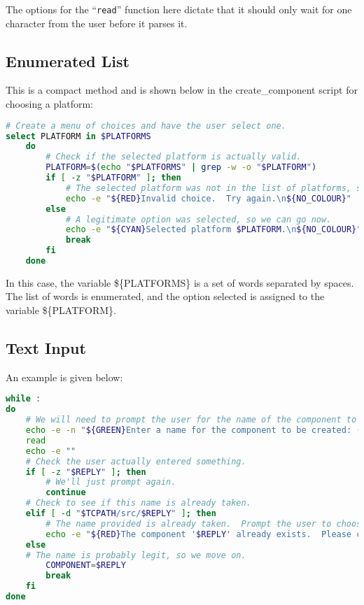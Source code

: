 \documentclass[a4paper, oneside, 11pt, titlepage, onecolumn, openright]{report}
\begin{document}
				The options for the ``\texttt{read}'' function here dictate that it should only wait for one character from the user before it parses it.

\subsection{Enumerated List}
			\label{ss:EnumeratedList}	
				This is a compact method and is shown below in the create\_component script for choosing a platform:
				
\begin{lstlisting}[frame=trBL, breaklines=true, language = bash]				
# Create a menu of choices and have the user select one.
select PLATFORM in $PLATFORMS
	do
		# Check if the selected platform is actually valid.
		PLATFORM=$(echo "$PLATFORMS" | grep -w -o "$PLATFORM")
		if [ -z "$PLATFORM" ]; then
			# The selected platform was not in the list of platforms, so the user is apparently a moron.
			echo -e "${RED}Invalid choice.  Try again.\n${NO_COLOUR}"
		else
			# A legitimate option was selected, so we can go now.
			echo -e "${CYAN}Selected platform $PLATFORM.\n${NO_COLOUR}"
			break
		fi
	done				
\end{lstlisting}			


In this case, the variable \$\{PLATFORMS\} is a set of words separated by spaces. The list of words is enumerated, and the option selected is assigned to the variable \$\{PLATFORM\}. 

\subsection{Text Input}
			\label{ss:TextInput}
			An example is given below:

\begin{lstlisting}[frame=trBL, breaklines=true, language = bash]		
while :
do
	# We will need to prompt the user for the name of the component to create.
	echo -e -n "${GREEN}Enter a name for the component to be created: (No spaces) ${NO_COLOUR}"
	read
	echo -e "" 
	# Check the user actually entered something.
	if [ -z "$REPLY" ]; then
		# We'll just prompt again.
		continue
	# Check to see if this name is already taken.
	elif [ -d "$TCPATH/src/$REPLY" ]; then
		# The name provided is already taken.  Prompt the user to choose an available name.
		echo -e "${RED}The component '$REPLY' already exists.  Please choose another name.\n${NO_COLOUR}"
	else
	# The name is probably legit, so we move on.
		COMPONENT=$REPLY
		break
	fi
done
\end{lstlisting}
\end{document}
